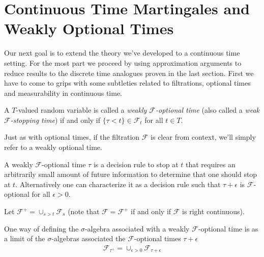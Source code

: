 \section {Continuous Time Martingales and Weakly Optional Times}

Our next goal is to extend the theory we've developed to a continuous
time setting.  For the most part we proceed by using approximation
arguments to reduce results to the discrete time analogues proven in
the last section.  First we have to come to grips with some subtleties
related to filtrations, optional times and measurability in continuous
time.

\begin{defn}A $T$-valued random variable is called a
  \emph{weakly $\mathcal{F}$-optional time} (also called a
  \emph{weak $\mathcal{F}$-stopping time}) if and only if $\lbrace \tau <
  t \rbrace \in \mathcal{F}_t$ for all $t \in T$.  
\end{defn}
Just as with optional times, if the filtration $\mathcal{F}$ is clear
from context, we'll simply refer to a weakly optional time.

A weakly $\mathcal{F}$-optional time $\tau$ is a decision rule to stop
at $t$ that requires an arbitrarily small amount of future information
to determine that one should stop at $t$.  Alternatively one can
characterize it as a decision rule such that $\tau + \epsilon$ is
$\mathcal{F}$-optional for all $\epsilon>0$.

Let $\mathcal{F}^+ = \cup_{s>t} \mathcal{F}_s$ (note that $\mathcal{F}
= \mathcal{F}^+$ if and only if $\mathcal{F}$ is right continuous).

One way of defining the $\sigma$-algebra associated with a weakly
$\mathcal{F}$-optional time is as a limit of the $\sigma$-algebras
associated the $\mathcal{F}$-optional times $\tau + \epsilon$
\begin{align*}
\mathcal{F}_{\tau^+} = \cup_{\epsilon > 0} \mathcal{F}_{\tau + \epsilon}
\end{align*}

